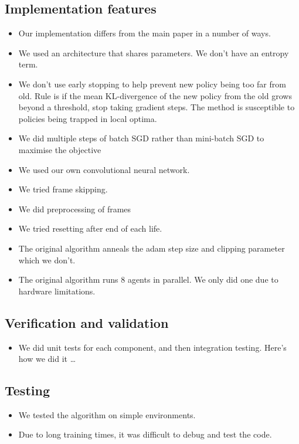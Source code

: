 \documentclass[12pt,a4paper]{article}
\begin{document}
\subsection{Implementation features}
\begin{itemize}
    \item Our implementation differs from the main paper in a number of ways.
    \item We used an architecture that shares parameters. We don't have an entropy term.
    \item We don't use early stopping to help prevent new policy being too far from old. Rule is if the mean KL-divergence of the new policy from the old grows beyond a threshold, stop taking gradient steps. The method is susceptible to policies being trapped in local optima.
    \item We did multiple steps of batch SGD rather than mini-batch SGD to maximise the objective
    \item We used our own convolutional neural network.
    \item We tried frame skipping.
    \item We did preprocessing of frames
    \item We tried resetting after end of each life. 
    \item The original algorithm anneals the adam step size and clipping parameter which we don't.
    \item The original algorithm runs 8 agents in parallel. We only did one due to hardware limitations.
\end{itemize}

\subsection{Verification and validation}
\begin{itemize}
    \item We did unit tests for each component, and then integration testing. Here's how we did it \dots
\end{itemize}

\subsection{Testing}
\begin{itemize}
    \item We tested the algorithm on simple environments. 
    \item Due to long training times, it was difficult to debug and test the code. 
\end{itemize}
\end{document}
